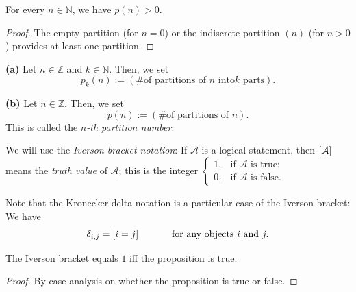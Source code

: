 \begin{lemma}
\label{lem.pars.partitionCount-pos}
\leanhelper
\leanok
For every $n\in\mathbb{N}$, we have $p(n) > 0$.
\end{lemma}

\begin{proof}
\leanok
The empty partition (for $n=0$) or the indiscrete partition $(n)$ (for $n>0$)
provides at least one partition.
\end{proof}

\begin{definition}
\label{def.pars.pn-pkn}
\leantarget
\leanok
\textbf{(a)} Let $n\in\mathbb{Z}$ and $k\in\mathbb{N}$.
Then, we set%
\[
p_{k}\left(  n\right)  :=\left(  \text{\# of partitions of }n\text{ into
}k\text{ parts}\right)  .
\]

\textbf{(b)} Let $n\in\mathbb{Z}$. Then, we set%
\[
p\left(  n\right)  :=\left(  \text{\# of partitions of }n\right)  .
\]
This is called the $n$\emph{-th partition number}.
\end{definition}

\begin{definition}
\label{def.pars.iverson}
\leantarget
\leanok
We will use the \emph{Iverson bracket notation}: If
$\mathcal{A}$ is a logical statement, then $\left[ \mathcal{A} \right]$
means the \emph{truth value} of $\mathcal{A}$; this is the integer $%
\begin{cases}
1, & \text{if }\mathcal{A}\text{ is true};\\
0, & \text{if }\mathcal{A}\text{ is false}.
\end{cases}
$

Note that the Kronecker delta notation is a particular case of the Iverson
bracket: We have
\[
\delta_{i,j}=\ive{i=j}\ \ \ \ \ \ \ \ \ \ \text{for any objects
}i\text{ and }j.
\]
\end{definition}

\begin{lemma}
\label{lem.pars.iverson-eq-one-iff}
\leanhelper
\leanok
The Iverson bracket equals $1$ iff the proposition is true.
\end{lemma}

\begin{proof}
\leanok
By case analysis on whether the proposition is true or false.
\end{proof}

